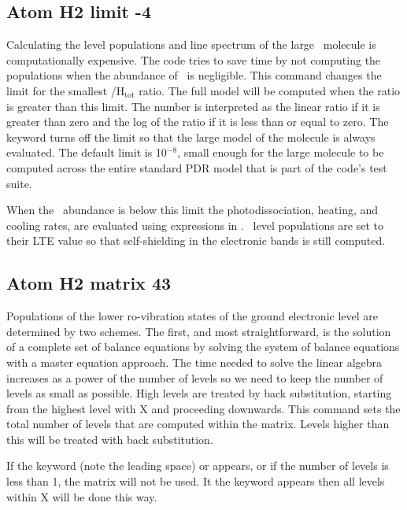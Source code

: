 \subsection{Atom H2 limit -4  }

Calculating the level populations and line spectrum of the large \htwo\ molecule is computationally expensive.
The code tries to save time by not
computing the populations when the abundance of \htwo\ is negligible.  This
command changes the limit for the smallest \htwo/H$_{\mathrm{tot}}$ ratio.
The full model
will be computed when the ratio is greater than this limit.
The number
is interpreted as the linear ratio if it is greater than zero and the log
of the ratio if it is less than or equal to zero.
The keyword
 turns
off the limit so that the large model of the molecule is always evaluated.
The default limit is 10$^{-8}$, small enough for the large molecule to be
computed across the entire \citet{Tielens1985a} standard PDR
model that is part of the code's test suite.

When the \htwo\ abundance is below this limit the photodissociation,
heating, and cooling rates, are evaluated using expressions in
\citet{Tielens1985a}.
\htwo\ level populations are set to their LTE value so that
self-shielding in the electronic bands is still computed.

\subsection{Atom H2 matrix 43}

Populations of the lower ro-vibration states of the ground electronic
level are determined by two schemes.
The first, and most straightforward,
is the solution of a complete set of balance equations by solving
the system
of balance equations with a master equation approach.
The time needed to solve the linear
algebra increases as a power of the number of levels
so we need to keep
the number of levels as small as possible.
High levels are treated by back
substitution, starting from the highest level with X and proceeding
downwards.
This command sets the total number of levels that are computed
within the matrix.
Levels higher than this will be treated with back
substitution.

If the keyword  (note the leading space) or
 appears, or if the
number of levels is less than 1, the matrix will not be used.
It the keyword
 appears then all levels within X will be done this way.

